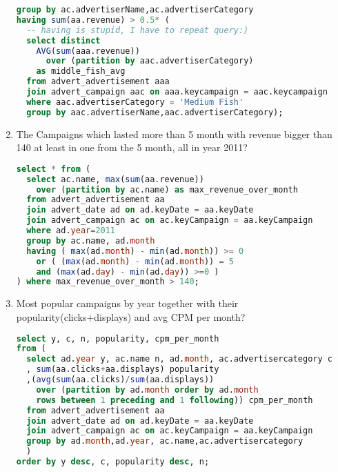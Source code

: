 \begin{enumerate}
\begin{lstlisting}[language=sql]
group by ac.advertiserName,ac.advertiserCategory
having sum(aa.revenue) > 0.5* (
  -- having is stupid, I have to repeat query:)
  select distinct
    AVG(sum(aaa.revenue)) 
      over (partition by aac.advertiserCategory) 
    as middle_fish_avg
  from advert_advertisement aaa 
  join advert_campaign aac on aaa.keycampaign = aac.keycampaign
  where aac.advertiserCategory = 'Medium Fish'   
  group by aac.advertiserName,aac.advertiserCategory);
  \end{lstlisting}
\item    The Campaigns which lasted more than 5 month with revenue bigger than 140 at least in one from the 5 month, all in year 2011?
  \begin{lstlisting}[language=sql] 
select * from (
  select ac.name, max(sum(aa.revenue)) 
    over (partition by ac.name) as max_revenue_over_month
  from advert_advertisement aa
  join advert_date ad on ad.keyDate = aa.keyDate
  join advert_campaign ac on ac.keyCampaign = aa.keyCampaign
  where ad.year=2011
  group by ac.name, ad.month
  having ( max(ad.month) - min(ad.month)) >= 0 
    or ( (max(ad.month) - min(ad.month)) = 5 
    and (max(ad.day) - min(ad.day)) >=0 )
) where max_revenue_over_month > 140;
  \end{lstlisting}
\item Most popular campaigns by year together with their popularity(clicks+displays) and  avg CPM per month?
  \begin{lstlisting}[language=sql] 
select y, c, n, popularity, cpm_per_month
from (
  select ad.year y, ac.name n, ad.month, ac.advertisercategory c
  , sum(aa.clicks+aa.displays) popularity
  ,(avg(sum(aa.clicks)/sum(aa.displays)) 
    over (partition by ad.month order by ad.month 
    rows between 1 preceding and 1 following)) cpm_per_month
  from advert_advertisement aa
  join advert_date ad on ad.keyDate = aa.keyDate
  join advert_campaign ac on ac.keyCampaign = aa.keyCampaign
  group by ad.month,ad.year, ac.name,ac.advertisercategory
  )
order by y desc, c, popularity desc, n;
  \end{lstlisting}
\end{enumerate}



